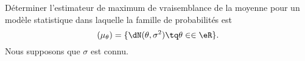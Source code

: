 
\begin{exercice}\label{exoModel-0003}

    Déterminer l'estimateur de maximum de vraisemblance de la moyenne pour un modèle statistique dans laquelle la famille de probabilités est
    \begin{equation}
        (\mu_{\theta})=\{ \dN(\theta,\sigma^2)\tq \theta\in\in\eR \}.
    \end{equation}
    Nous supposons que \( \sigma\) est connu.

\end{exercice}
